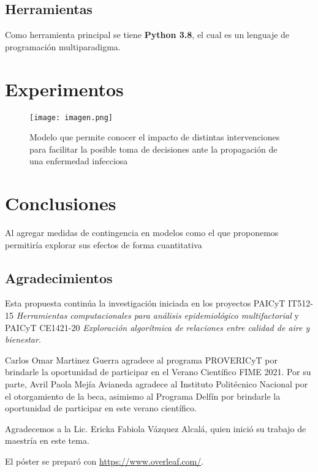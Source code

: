 \documentclass[a4]{sciposter}
\begin{document}
\begin{multicols}{2}
\subsection*{Herramientas}

Como herramienta principal se tiene \textbf{Python 3.8}, el cual es un lenguaje de programación multiparadigma.

\section{Experimentos}

\begin{figure}[h]
\setcounter{figure}{1}
\captionsetup{type=figure}
\begin{center}
   \texttt{[image: imagen.png]}
   \end{center}
    \caption{Modelo que permite conocer el impacto de distintas intervenciones para facilitar la posible toma de decisiones ante la propagación de una enfermedad infecciosa}
    \label{imagen}
    \centering
\end{figure}

\section{Conclusiones}

Al agregar medidas de contingencia en modelos como el que proponemos permitiría explorar sus efectos de forma cuantitativa

\subsection*{Agradecimientos}

{\small Esta propuesta continúa la investigación iniciada en los proyectos PAICyT IT512-15 \emph{Herramientas computacionales para análisis epidemiológico multifactorial} y PAICyT CE1421-20 \emph{Exploración algorítmica de relaciones entre calidad de aire y bienestar}.
    
    Carlos Omar Martinez Guerra agradece al programa PROVERICyT por brindarle la oportunidad de participar en el Verano Científico FIME 2021.
    Por su parte, Avril Paola Mejía Avianeda agradece al Instituto Politécnico Nacional por el otorgamiento de la beca, asimismo al Programa Delfín por brindarle la oportunidad de participar en este verano científico.

    Agradecemos a la Lic. Ericka Fabiola Vázquez Alcalá, quien inició su trabajo de maestría en este tema.
    
    El póster se preparó con \url{https://www.overleaf.com/}.}

\end{multicols} 



\end{document}
